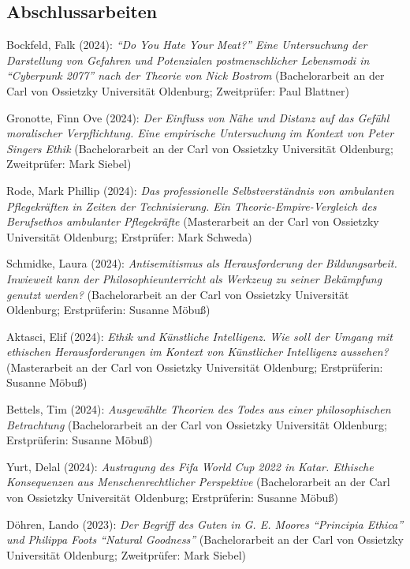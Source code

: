 \documentclass[a4paper,10pt]{article}
\newenvironment{literature}{%
   \parskip6pt\parindent0pt\raggedright
   \def\lititem{\hangindent=1cm\hangafter1}}{%
   \par\ignorespaces}
\begin{document}
\subsection*{Abschlussarbeiten}
\begin{literature}
\lititem Bockfeld, Falk (2024): \textit{\enquote{Do You Hate Your Meat?} Eine Untersuchung der Darstellung von Gefahren und Potenzialen postmenschlicher Lebensmodi in \enquote{Cyberpunk 2077} nach der Theorie von Nick Bostrom} (Bachelorarbeit an der Carl von Ossietzky Universität Oldenburg; Zweitprüfer: Paul Blattner)

\lititem Gronotte, Finn Ove (2024): \textit{Der Einfluss von Nähe und Distanz auf das Gefühl moralischer Verpflichtung. Eine empirische Untersuchung im Kontext von Peter Singers Ethik} (Bachelorarbeit an der Carl von Ossietzky Universität Oldenburg; Zweitprüfer: Mark Siebel)

\lititem Rode, Mark Phillip (2024): \textit{Das professionelle Selbstverständnis von ambulanten Pflegekräften in Zeiten der Technisierung. Ein Theorie-Empire-Vergleich des Berufsethos ambulanter Pflegekräfte} (Masterarbeit an der Carl von Ossietzky Universität Oldenburg; Erstprüfer: Mark Schweda)

\lititem Schmidke, Laura (2024): \textit{Antisemitismus als Herausforderung der Bildungsarbeit. Inwieweit kann der Philosophieunterricht als Werkzeug zu seiner Bekämpfung genutzt werden?} (Bachelorarbeit an der Carl von Ossietzky Universität Oldenburg; Erstprüferin: Susanne Möbuß)

\lititem Aktasci, Elif (2024): \textit{Ethik und Künstliche Intelligenz. Wie soll der Umgang mit ethischen Herausforderungen im Kontext von Künstlicher Intelligenz aussehen?} (Masterarbeit an der Carl von Ossietzky Universität Oldenburg; Erstprüferin: Susanne Möbuß)

\lititem Bettels, Tim (2024): \textit{Ausgewählte Theorien des Todes aus einer philosophischen Betrachtung} (Bachelorarbeit an der Carl von Ossietzky Universität Oldenburg; Erstprüferin: Susanne Möbuß)

\lititem Yurt, Delal (2024): \textit{Austragung des Fifa World Cup 2022 in Katar. Ethische Konsequenzen aus Menschenrechtlicher Perspektive} (Bachelorarbeit an der Carl von Ossietzky Universität Oldenburg; Erstprüferin: Susanne Möbuß)

\lititem Döhren, Lando (2023): \textit{Der Begriff des Guten in G. E. Moores \enquote{Principia Ethica} und Philippa Foots \enquote{Natural Goodness}} (Bachelorarbeit an der Carl von Ossietzky Universität Oldenburg; Zweitprüfer: Mark Siebel)


\end{literature}
\end{document}
